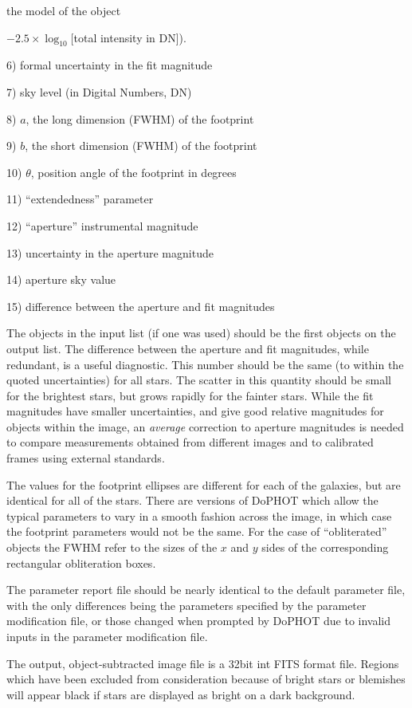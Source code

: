 the model of the object {$-2.5 \times \log_{10}$[total intensity in DN]).
\item{6)} formal uncertainty in the fit magnitude
\item{7)}  sky level (in Digital Numbers, DN)
\item{8)}  $a$, the long dimension (FWHM) of the footprint
\item{9)}  $b$, the short dimension (FWHM) of the footprint
\item{10)}  $\theta$, position angle of the footprint in degrees
\item{11)} ``extendedness'' parameter
\item{12)} ``aperture'' instrumental magnitude
\item{13)} uncertainty in the aperture magnitude
\item{14)} aperture sky value
\item{15)} difference between the aperture and fit magnitudes

The objects in the input list (if one was used) 
should be the first objects on
the output list.  The difference between the aperture and
fit magnitudes, while redundant, is a useful diagnostic.
This number should be the same (to within the quoted
uncertainties) for all stars.  The scatter in this quantity
should be small for the brightest stars, but grows rapidly
for the fainter stars.  While the fit magnitudes have
smaller uncertainties, and give good relative magnitudes for
objects within the image, an {\it average} correction to
aperture magnitudes is needed to compare measurements
obtained from different images and to calibrated frames using
external standards.

The values for the footprint ellipses are different for each
of the galaxies, but are identical for all of the stars.
There are versions of DoPHOT which allow the typical
parameters to vary in a smooth fashion across the image, in
which case the footprint parameters would not be the same.
For the case of ``obliterated'' objects the FWHM refer to the sizes
of the $x$ and $y$ sides of the corresponding rectangular 
obliteration boxes.

The parameter report file should be nearly identical to
the default parameter file, with the only differences
being the parameters specified by the parameter modification
file, or those changed when prompted by DoPHOT due to
invalid inputs in the parameter modification file.

The output, object-subtracted image file is a 32bit int FITS
format file.  Regions which have been
excluded from consideration because of bright stars or
blemishes will appear black if stars are displayed as bright
on a dark background.

}
